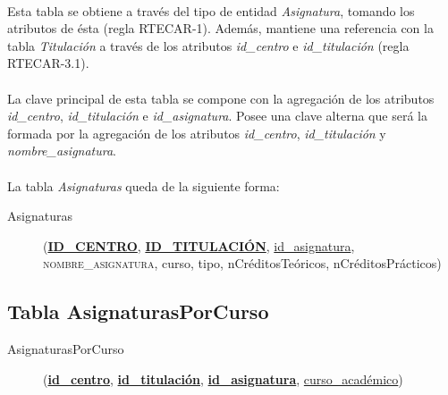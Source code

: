       \paragraph{}Esta tabla se obtiene a través del tipo de entidad
      \textit{Asignatura}, tomando los atributos de ésta (regla RTECAR-1).
      Además, mantiene una referencia con la tabla \textit{Titulación} a través
      de los atributos \textit{id\_centro} e \textit{id\_titulación} (regla
      RTECAR-3.1).

      \paragraph{}La clave principal de esta tabla se compone con la agregación
      de los atributos \textit{id\_centro}, \textit{id\_titulación} e
      \textit{id\_asignatura}. Posee una clave alterna que será la formada por
      la agregación de los atributos \textit{id\_centro},
      \textit{id\_titulación} y \textit{nombre\_asignatura}.

      \paragraph{}La tabla \textit{Asignaturas} queda de la siguiente forma:

      \begin{description}
         \item[Asignaturas] \begin{flushleft}(\underline{\textbf{ID\_CENTRO}},
         \underline{\textbf{ID\_TITULACIÓN}}, \underline{id\_asignatura},
         \textsc{nombre\_asignatura}, curso, tipo, nCréditosTeóricos,
         nCréditosPrácticos)\end{flushleft}
      \end{description}

   \subsection{Tabla AsignaturasPorCurso}

      \begin{description}
         \item[AsignaturasPorCurso] \begin{flushleft}(\underline{\textbf{id\_centro}},
         \underline{\textbf{id\_titulación}}, \underline{\textbf{id\_asignatura}},
         \underline{curso\_académico})\end{flushleft}
      \end{description}


